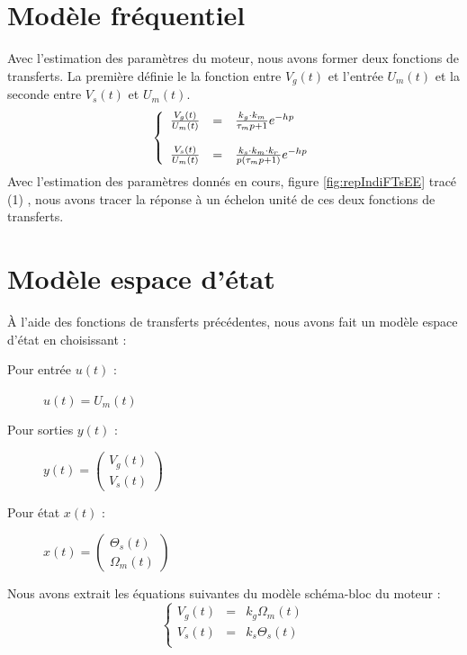 	\section{Modèle fréquentiel}
Avec l'estimation des paramètres du moteur, nous avons former deux fonctions de transferts. La première définie le la fonction entre $V_g(t)$ et l'entrée $U_m(t)$ et la seconde entre $V_s(t)$ et $U_m(t)$. 
\begin{equation}
\left\lbrace
\begin{array}{l c l }
\frac{V_g(t)}{U_m(t)} 	&=& 	\frac{k_g \cdot k_m}{\tau_m p + 1	}e^{-hp}\\
&&\\
\frac{V_s(t)}{U_m(t)} 	&=& 	\frac{k_s \cdot k_m \cdot k_r}{ p\left(\tau_m p + 1\right)	}e^{-hp}\\
\end{array}
\right.
\end{equation}
Avec l'estimation des paramètres donnés en cours, figure \ref{fig:repIndiFTsEE} tracé (1) , nous avons tracer la réponse à un échelon unité de ces deux fonctions de transferts.
	\section{Modèle espace d'état}
À l'aide des fonctions de transferts précédentes, nous avons fait un modèle espace d'état en choisissant : \\
\begin{description}
\item[Pour entrée $u(t)$ :] $u(t) = U_m(t) $
\item[Pour sorties $y(t)$ :] $ y(t) = \begin{pmatrix}
V_g(t) \\
V_s(t)
\end{pmatrix}$
\item[Pour état $x(t)$ :] $x(t) = \begin{pmatrix}
\Theta_s(t)\\
\Omega_m(t)
\end{pmatrix}$
\end{description}
Nous avons extrait les équations suivantes du modèle schéma-bloc du moteur :
\begin{equation}
\label{eq:VsVgModel}
\left\lbrace
\begin{array}{lcl}
V_g(t) 	&=&		k_g \Omega_m(t)\\
V_s(t) 	&=&		k_s \Theta_s(t)\\
\end{array}
\right.
\end{equation}

